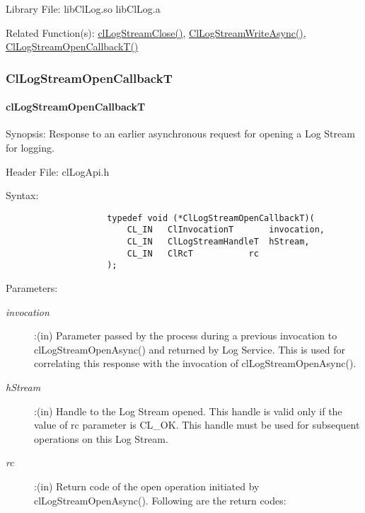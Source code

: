 \begin{flushleft}
\begin{Desc}
\end{Desc}
\begin{Desc}
\item[Library File:] libClLog.so\newline
libClLog.a\end{Desc}
\begin{Desc}
\item[Related Function(s):]\hyperlink{pagelog108}{clLogStreamClose()}, \hyperlink{pagelog109}{ClLogStreamWriteAsync()},
\hyperlink{pagelog107}{ClLogStreamOpenCallbackT()}\end{Desc}
\newpage




\subsubsection{ClLogStreamOpenCallbackT}
\hypertarget{pagelog107}{}\paragraph{cl\-Log\-Stream\-Open\-CallbackT}\label{pagelog107}
\begin{Desc}
\item[Synopsis:]Response to an earlier asynchronous request for opening a Log Stream for logging.\end{Desc}
\begin{Desc}
\item[Header File:] clLogApi.h \end{Desc}
\begin{Desc}
\item[Syntax:]
\footnotesize\begin{verbatim}        	
					typedef void (*ClLogStreamOpenCallbackT)(
						CL_IN	ClInvocationT		invocation,
						CL_IN	ClLogStreamHandleT	hStream,
						CL_IN	ClRcT			rc
					);

\end{verbatim}
\normalsize
\end{Desc}
\begin{Desc}
\item[Parameters:] \begin{description}
\item[{\em invocation}]:(in) Parameter passed by the process during a previous invocation to clLogStreamOpenAsync() and returned by Log Service.
This is used for correlating this response with the invocation of clLogStreamOpenAsync().
\item[{\em hStream}]:(in) Handle to the Log Stream opened. This handle is valid only if the value of rc parameter is CL\_\-OK. This handle must be used 
for subsequent operations on this Log Stream.
\item[{\em rc}]:(in) Return code of the open operation initiated by clLogStreamOpenAsync(). Following are the return codes:
\end{description}


\end{Desc}
\end{flushleft}

